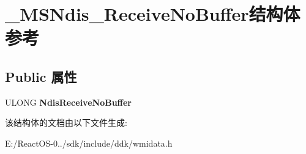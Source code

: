 \hypertarget{struct___m_s_ndis___receive_no_buffer}{}\section{\+\_\+\+M\+S\+Ndis\+\_\+\+Receive\+No\+Buffer结构体 参考}
\label{struct___m_s_ndis___receive_no_buffer}
\subsection*{Public 属性}
\begin{DoxyCompactItemize}
\item 
\mbox{\label{struct___m_s_ndis___receive_no_buffer_a11c45c366afa030551b74de5cad7af72}} 
U\+L\+O\+NG {\bfseries Ndis\+Receive\+No\+Buffer}
\end{DoxyCompactItemize}


该结构体的文档由以下文件生成\+:\begin{DoxyCompactItemize}
\item 
E\+:/\+React\+O\+S-\/0../sdk/include/ddk/wmidata.\+h\end{DoxyCompactItemize}
